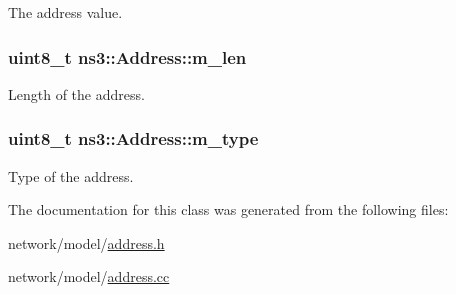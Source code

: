 The address value. 

\subsubsection[{\texorpdfstring{m\+\_\+len}{m_len}}]{\setlength{\rightskip}{0pt plus 5cm}uint8\+\_\+t ns3\+::\+Address\+::m\+\_\+len\hspace{0.3cm}{\ttfamily [private]}}\hypertarget{classns3_1_1Address_a32902f96babca046e1917f014ec068ea}{}\label{classns3_1_1Address_a32902f96babca046e1917f014ec068ea}


Length of the address. 

\subsubsection[{\texorpdfstring{m\+\_\+type}{m_type}}]{\setlength{\rightskip}{0pt plus 5cm}uint8\+\_\+t ns3\+::\+Address\+::m\+\_\+type\hspace{0.3cm}{\ttfamily [private]}}\hypertarget{classns3_1_1Address_a87c645799a51ab3e837e109311f6df1b}{}\label{classns3_1_1Address_a87c645799a51ab3e837e109311f6df1b}


Type of the address. 



The documentation for this class was generated from the following files\+:\begin{DoxyCompactItemize}
\item 
network/model/\hyperlink{address_8h}{address.\+h}\item 
network/model/\hyperlink{address_8cc}{address.\+cc}\end{DoxyCompactItemize}
